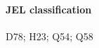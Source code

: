 \documentclass[english,5p,authoryear]{elsarticle}
\begin{document}







\paragraph*{JEL classification} D78; H23; Q54; Q58








\end{document}

